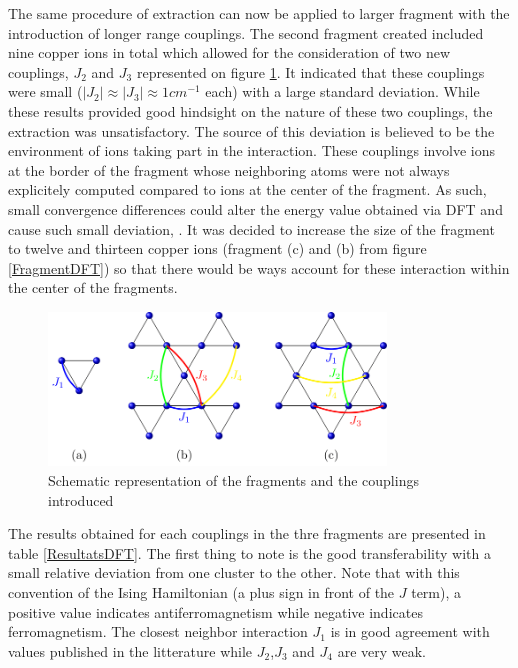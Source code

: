 \documentclass[10pt]{report}
\numberwithin{equation}{section}
\begin{document}
The same procedure of extraction can now be applied to larger fragment with the introduction of longer range couplings.
The second fragment created included nine copper ions in total which allowed for the consideration of two new couplings, $J_2$ and $J_3$ represented on figure \ref{CouplageDFT}.
It indicated that these couplings were small ($|J_{2}|\approx |J_{3}|\approx1 cm^{-1}$ each) with a large standard deviation.
While these results provided good hindsight on the nature of these two couplings, the extraction was unsatisfactory.
The source of this deviation is believed to be the environment of ions taking part in the interaction. 
These couplings involve ions at the border of the fragment whose neighboring atoms were not always explicitely computed compared to ions at the center of the fragment.
As such, small convergence differences could alter the energy value obtained via DFT and cause such small deviation,  .
It was decided to increase the size of the fragment to twelve and thirteen copper ions (fragment (c) and (b) from figure \ref{FragmentDFT}) so that there would be ways account for these interaction within the center of the fragments.


\begin{figure}[h!]
    \centering
    \includegraphics[width=0.8\textwidth]{Images/ModeleDFT_plan.png}
    \caption{Schematic representation of the fragments and the couplings introduced}
    \label{CouplageDFT}
\end{figure}

The results obtained for each couplings in the thre fragments are presented in table \ref{ResultatsDFT}.
The first thing to note is the good transferability with a small relative deviation from one cluster to the other.
Note that with this convention of the Ising Hamiltonian (a plus sign in front of the $J$ term), a positive value indicates antiferromagnetism while negative indicates ferromagnetism.
The closest neighbor interaction $J_1$ is in good agreement with values published in the litterature while $J_2$,$J_3$ and $J_4$ are very weak. 
\end{document}
